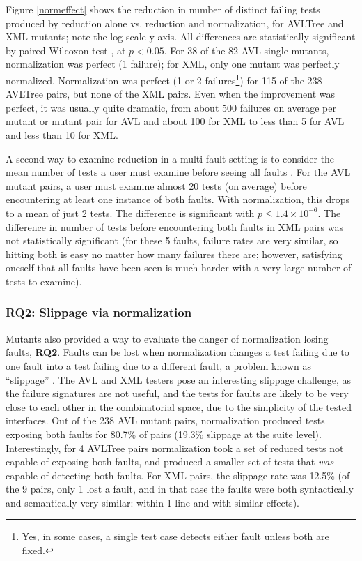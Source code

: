 Figure \ref{normeffect} shows the reduction in number of distinct
failing tests produced by reduction alone vs. reduction and
normalization, for AVLTree and XML mutants; note the
log-scale y-axis.  All
differences are statistically significant by paired Wilcoxon test \cite{arcuri2014hitchhiker}, at $p
< 0.05$.  For 38 of the 82 AVL single mutants, normalization was
perfect (1 failure); for XML, only one mutant was perfectly
normalized.  Normalization was perfect (1 or 2 failures\footnote{Yes,
  in some cases, a single test case detects either fault unless both
  are fixed.}) for 115 of the 238 AVLTree pairs, but none of the XML
pairs.  Even when the improvement was perfect, it was usually quite dramatic, from about 500 failures on average per mutant or
mutant pair for AVL and about
100 for XML to less than 5 for AVL and less than 10 for XML.

A second way to examine reduction in a multi-fault setting is to
consider the mean number of tests a user must examine before seeing
all faults \cite{PLDI13}.  For the AVL mutant pairs, a user must
examine almost 20 tests (on average) before encountering at least
one instance of both faults.  With normalization, this  drops
to a mean of just 2 tests.  The difference is significant with
$p\leq1.4\times10^{-6}$.  The
difference in number of tests before encountering both faults in XML pairs
was not statistically significant (for these 5 faults,
failure rates are very similar, so hitting both is easy no matter how
many failures there are; however, satisfying oneself that all faults
have been seen is much harder with a very large number of tests to examine). 

\subsubsection{RQ2: Slippage via normalization}

Mutants also provided a way to evaluate the danger of
normalization losing faults, {\bf RQ2}.  Faults can be lost when normalization
changes a test failing due to one fault into a test failing
due to a different fault, a problem known as ``slippage''
\cite{PLDI13,slippage}.  The AVL and XML testers pose an interesting
slippage challenge, as the failure signatures are not useful, and the tests
for faults are likely to be very close to each other in the
combinatorial space, due to the simplicity of the tested interfaces.
Out of the 238 AVL mutant pairs, normalization produced tests
exposing both faults for 80.7\% of pairs (19.3\% slippage at the
suite level).  Interestingly, for 4 AVLTree pairs
normalization took a set of reduced tests not capable of exposing
both faults, and produced a smaller set of tests that \emph{was} capable
of detecting both faults.  For XML pairs, the slippage rate was 12.5\%
(of the 9 pairs, only 1 lost a fault, and in that case the faults were
both syntactically and semantically very similar: within 1 line and
with similar effects).

